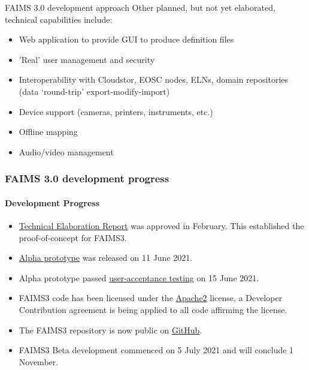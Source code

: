 \begin{frame}{FAIMS 3.0 development approach}
Other planned, but not yet elaborated, technical capabilities include:
    \begin{itemize}
        \item Web application to provide GUI to produce definition files
        \item 'Real' user management and security
        \item Interoperability with Cloudstor, EOSC nodes, ELNs, domain repositories (data `round-trip' export-modify-import)
        \item Device support (cameras, printers, instruments, etc.)
        \item Offline mapping
        \item Audio/video management
    \end{itemize}
\end{frame}


\begin{frame}
    \frametitle{FAIMS 3.0 development progress}
    \framesubtitle{Development Progress}        
        \begin{itemize}
            \item \href{https://docs.google.com/document/d/13eTN8jhJa3Pgs9GOdo7r4jtIQcskNo7ikxJcBDBKHzw/edit}{Technical Elaboration Report} was approved in February. This established the proof-of-concept for FAIMS3. 
          \item \href{https://github.com/FAIMS/FAIMS3/releases/tag/v0.1.0-alpha}{Alpha prototype} was released on 11 June 2021.  
          \item Alpha prototype passed \href{https://doi.org/10.5281/zenodo.5030772}{user-acceptance testing} on 15 June 2021.
        \item FAIMS3 code has been licensed under the \href{https://www.apache.org/licenses/LICENSE-2.0}{Apache2} license, a Developer Contribution agreement is being applied to all code affirming the license. 
        \item The FAIMS3 repository is now public on \href{https://github.com/FAIMS/FAIMS3}{GitHub}.
        \item FAIMS3 Beta development commenced on 5 July 2021 and will conclude 1 November. 

    \end{itemize}



\end{frame} 